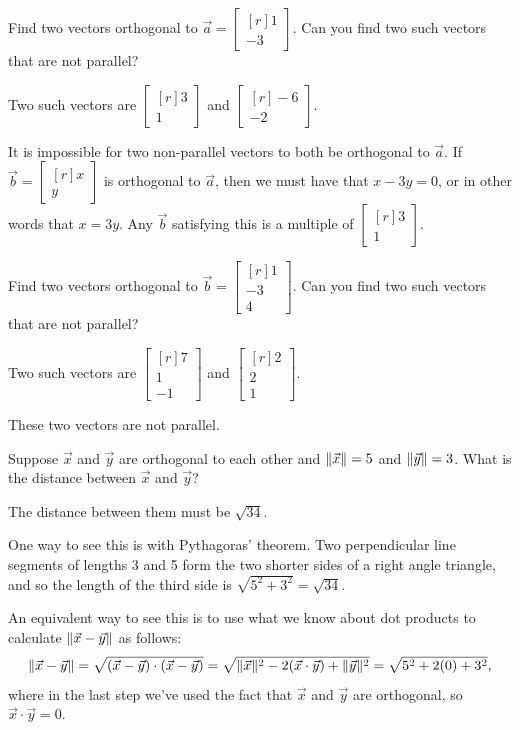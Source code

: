\documentclass{problemset}
\newcommand{\mat}[1]{\begin{bmatrix*}[r]#1\end{bmatrix*}}
\DeclarePairedDelimiter\norm{\lVert}{\rVert}
\begin{document}
	\question
	\begin{parts}
		\item Find two vectors orthogonal to $\vec a=\mat{1\\-3}$.  Can you find 
			two such vectors that are not parallel?
			\begin{solution}
				Two such vectors are $\mat{3\\1}$ and $\mat{-6\\-2}$. 

				It is impossible for two non-parallel vectors to both be
				orthogonal to $\vec a$. If $\vec b = \mat{x\\y}$ is orthogonal to
				$\vec a$, then we must have that $x - 3y = 0$, or in other words 
				that $x = 3y$. Any $\vec b$ satisfying this is a multiple of 
				$\mat{3\\1}$. 
			\end{solution}
		\item Find two vectors orthogonal to $\vec b=\mat{1\\-3\\4}$.  Can you 
			find two such vectors that are not parallel?
			\begin{solution}
				Two such vectors are $\mat{7\\1\\-1}$ and $\mat{2\\2\\1}$.

				These two vectors are not parallel. 
			\end{solution}
		\item Suppose $\vec x$ and $\vec y$ are orthogonal to each other and 
			$\norm{\vec x}=5$ and $\norm{\vec y}=3$. What is the distance between 
			$\vec x$ and $\vec y$?
			\begin{solution}
				The distance between them must be $\sqrt{34}$. 

				One way to see this is with Pythagoras' theorem. Two perpendicular 
				line segments of lengths 3 and 5 form the two shorter sides of a 
				right angle triangle, and so the length of the third side is
				$\sqrt{5^2 + 3^2} = \sqrt{34}$. 

				An equivalent way to see this is to use what we know about dot 
				products to calculate $\norm{\vec x-\vec y}$ as follows:
				\[
					\norm{\vec x-\vec y} = \sqrt{(\vec x-\vec y)\cdot(\vec x-\vec y)}
					= \sqrt{\norm{\vec x}^2 - 2(\vec x\cdot\vec y) + \norm{\vec y}^2}
					= \sqrt{5^2 + 2(0) + 3^2},
				\]
				where in the last step we've used the fact that $\vec x$ and $\vec y$
				are orthogonal, so $\vec x\cdot\vec y = 0$. 
			\end{solution}
	\end{parts}
\end{document}
